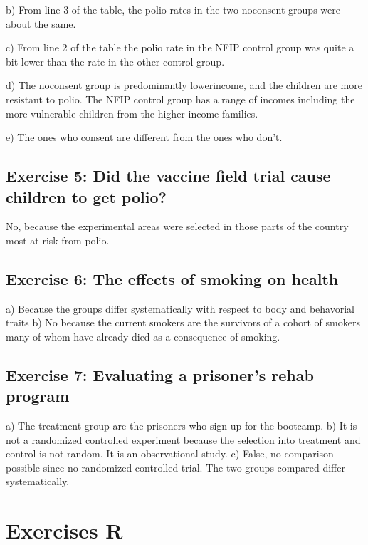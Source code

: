 \documentclass[letterpaper,10pt,english]{jupyterBook}
\begin{document}
\sphinxAtStartPar
b) From line 3 of the table, the polio rates in the two no\sphinxhyphen{}consent groups were about the same.

\sphinxAtStartPar
c) From line 2 of the table the polio rate in the NFIP control group was quite a bit lower than the rate in the other control group.

\sphinxAtStartPar
d) The no\sphinxhyphen{}consent group is predominantly lower\sphinxhyphen{}income, and the children are more resistant to polio. The NFIP control group has a range of incomes including the more vulnerable children from the higher income families.

\sphinxAtStartPar
e) The ones who consent are different from the ones who don’t.


\subsection{Exercise 5: Did the vaccine field trial cause children to get polio?}
\label{\detokenize{exercises_unit_3:exercise-5-did-the-vaccine-field-trial-cause-children-to-get-polio}}
\sphinxAtStartPar
No, because the experimental areas were selected in those parts of the country most at risk from polio.


\subsection{Exercise 6: The effects of smoking on health}
\label{\detokenize{exercises_unit_3:exercise-6-the-effects-of-smoking-on-health}}
\sphinxAtStartPar
a) Because the groups differ systematically with respect to body and behavorial traits
b) No because the current smokers are the survivors of a cohort of smokers many of whom have already died as a consequence of smoking.


\subsection{Exercise 7: Evaluating a prisoner’s rehab program}
\label{\detokenize{exercises_unit_3:exercise-7-evaluating-a-prisoner-s-rehab-program}}
\sphinxAtStartPar
a) The treatment group are the prisoners who sign up for the bootcamp. b) It is not a randomized controlled experiment because the selection into treatment and control is not random. It is an observational study. c) False, no comparison possible since no randomized controlled trial. The two groups compared differ systematically.


\section{Exercises R}
\label{\detokenize{exercises_unit_3:exercises-r}}
\end{document}
